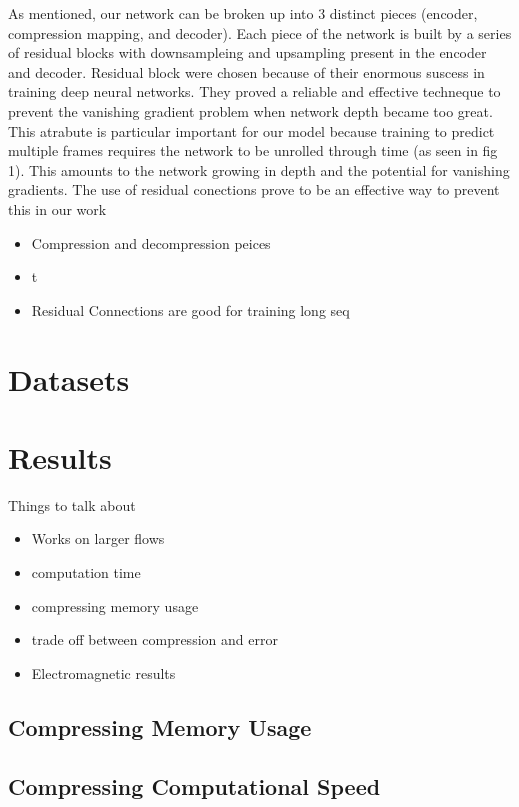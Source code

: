 \documentclass{article}
\begin{document}
As mentioned, our network can be broken up into 3 distinct pieces (encoder, compression mapping, and decoder). Each piece of the network is built by a series of residual blocks with downsampleing and upsampling present in the encoder and decoder. Residual block were chosen because of their enormous suscess in training deep neural networks. They proved a reliable and effective techneque to prevent the vanishing gradient problem when network depth became too great. This atrabute is particular important for our model because training to predict multiple frames requires the network to be unrolled through time (as seen in fig 1). This amounts to the network growing in depth and the potential for vanishing gradients. The use of residual conections prove to be an effective way to prevent this in our work

\begin{itemize}
  \item Compression and decompression peices
  \item t
  \item Residual Connections are good for training long seq
\end{itemize}

\section{Datasets}

\section{Results}

Things to talk about

\begin{itemize}
  \item Works on larger flows
  \item computation time
  \item compressing memory usage
  \item trade off between compression and error
  \item Electromagnetic results
\end{itemize}


\subsection{Compressing Memory Usage}

\subsection{Compressing Computational Speed}
\end{document}
